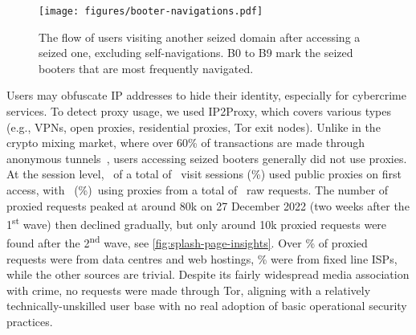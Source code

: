 \documentclass[letterpaper,twocolumn,10pt]{article}
\begin{document}
\begin{figure}[t]
    \centering
    \texttt{[image: figures/booter-navigations.pdf]}\\
    \caption{The flow of users visiting another seized domain after accessing a seized one, excluding self-navigations. B0 to B9 mark the seized booters that are most frequently navigated.}
    \label{fig:booter-navigations}
\end{figure}
Users may obfuscate IP addresses to hide their identity, especially for cybercrime services. To detect proxy usage, we used IP2Proxy, which covers various types (e.g., VPNs, open proxies, residential proxies, Tor exit nodes). Unlike in the crypto mixing market, where over 60\% of transactions are made through anonymous tunnels~\cite{miedema2023mixed}, users accessing seized booters generally did not use proxies. At the session level, \BTGroundTruthSessionsUsingProxy~of a total of \BTnTotalVisitSessions~visit sessions (\BTGroundTruthSessionsUsingProxyProps\%) used public proxies on first access, with \BTGroundTruthRequestsUsingProxy~(\BTGroundTruthRequestsUsingProxyProps\%)~using proxies from a total of \BTnTotalRawEvent~raw requests. The number of proxied requests peaked at around 80k on 27 December 2022 (two weeks after the 1\textsuperscript{st} wave) then declined gradually, but only around 10k proxied requests were found after the 2\textsuperscript{nd} wave, see \autoref{fig:splash-page-insights}. Over \BTGroundTruthRequestsUsageTypeDCHProps\% of proxied requests were from data centres and web hostings, \BTGroundTruthRequestsUsageTypeISPProps\% were from fixed line ISPs, while the other sources are trivial. Despite its fairly widespread media association with crime, no requests were made through Tor, aligning with a relatively technically-unskilled user base with no real adoption of basic operational security practices. 
\end{document}
